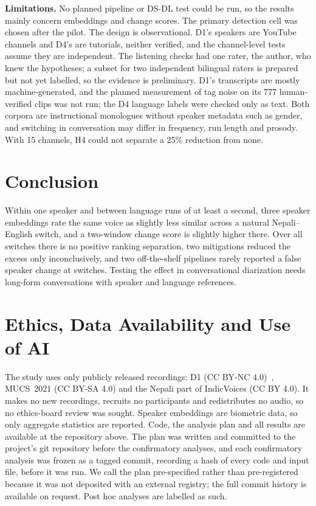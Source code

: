 \documentclass[conference]{IEEEtran}
\begin{document}
\textbf{Limitations.} No planned pipeline or DS-DL test could be run, so the results
mainly concern embeddings and change scores. The primary detection cell was chosen after
the pilot. The design is observational. D1's speakers are YouTube channels and D4's are
tutorials, neither verified, and the channel-level tests assume they are independent. The
listening checks had one rater, the author, who knew the hypotheses; a subset for two
independent bilingual raters is prepared but not yet labelled, so the evidence is
preliminary. D1's transcripts are mostly machine-generated, and the planned measurement of tag noise on its 777 human-verified clips was not run; the D4 language labels were checked only as text. Both corpora are instructional monologues without speaker metadata
such as gender, and switching in conversation may differ in frequency, run length and
prosody. With 15 channels, H4 could not separate a 25\% reduction from none.

\section{Conclusion}
\label{sec:conclusion}
Within one speaker and between language runs of at least a second, three speaker embeddings
rate the same voice as slightly less similar across a natural Nepali--English switch, and a
two-window change score is slightly higher there. Over all switches there is no positive ranking separation, two mitigations reduced the excess only inconclusively, and two off-the-shelf pipelines rarely reported a false speaker change at
switches. Testing the effect in conversational diarization needs long-form conversations
with speaker and language references.

\section{Ethics, Data Availability and Use of AI}
\label{sec:ethics}
The study uses only publicly released recordings: D1 (CC BY-NC 4.0)~\cite{dahal2026csasr},
MUCS~2021 (CC BY-SA 4.0) and the Nepali part of IndicVoices (CC BY 4.0). It makes no new
recordings, recruits no participants and redistributes no audio, so no ethics-board review
was sought. Speaker embeddings are biometric data, so only aggregate statistics are
reported. Code, the analysis plan and all results are available at the repository above. The plan was written and committed to the project's git repository before the confirmatory analyses, and each confirmatory analysis was frozen as a tagged commit, recording a hash of every code and input file, before it was run. We call the plan pre-specified rather than pre-registered because it was not deposited with an external registry; the full commit history is available on request. Post hoc analyses are labelled as such.
\end{document}
